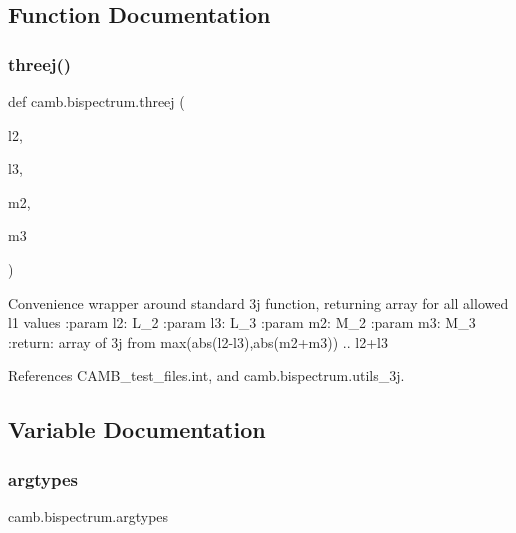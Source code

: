 \subsection{Function Documentation}
\mbox{\label{namespacecamb_1_1bispectrum_acfd276a5fe55c730d0e6894102263d26}} 
\subsubsection{\texorpdfstring{threej()}{threej()}}
{\footnotesize\ttfamily def camb.\+bispectrum.\+threej (\begin{DoxyParamCaption}\item[{}]{l2,  }\item[{}]{l3,  }\item[{}]{m2,  }\item[{}]{m3 }\end{DoxyParamCaption})}

\begin{DoxyVerb}Convenience wrapper around standard 3j function, returning array for all allowed l1 values
:param l2: L_2
:param l3: L_3
:param m2: M_2
:param m3: M_3
:return: array of 3j from  max(abs(l2-l3),abs(m2+m3)) .. l2+l3
\end{DoxyVerb}
 

References C\+A\+M\+B\+\_\+test\+\_\+files.\+int, and camb.\+bispectrum.\+utils\+\_\+3j.



\subsection{Variable Documentation}
\mbox{\label{namespacecamb_1_1bispectrum_a0201f75585677da352aea867ea3ae446}} 
\subsubsection{\texorpdfstring{argtypes}{argtypes}}
{\footnotesize\ttfamily camb.\+bispectrum.\+argtypes}

\mbox{\label{namespacecamb_1_1bispectrum_a20505d8d175bf2e5e275fc0f5c13e027}} 

